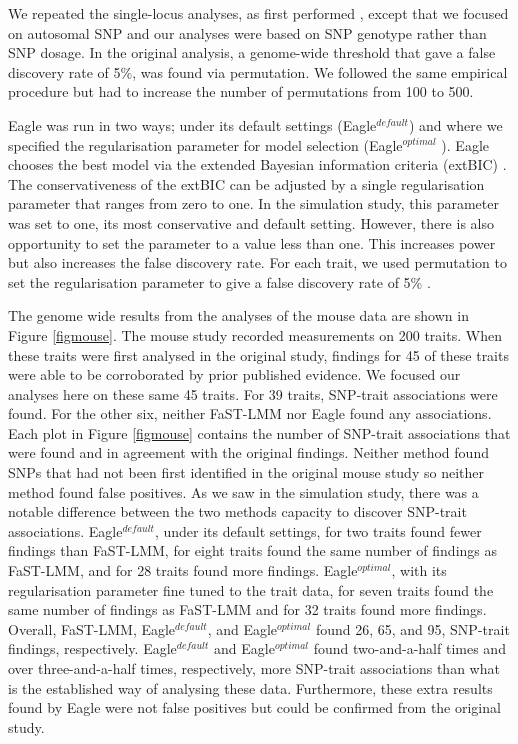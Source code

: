 \documentclass{nature}
\begin{document}
We repeated the single-locus analyses, as first performed  \cite{nicod2016genome}, except 
that we focused on autosomal SNP and our analyses were based on SNP genotype  rather than SNP dosage. 
In the original analysis, a genome-wide threshold that gave a false discovery rate of 5\%, was found via permutation. We followed the 
same empirical procedure but had to increase the number of permutations from 100 to 500. 

Eagle was run in two ways; under its default settings (Eagle$^{default}$) and where we specified the regularisation parameter for model selection (Eagle$^{optimal}$ ). Eagle chooses the best model via the extended Bayesian information criteria (extBIC) \cite{chen2008extended}. 
  The conservativeness of the extBIC can be adjusted by a single regularisation parameter that ranges from zero to one. In the simulation study, this parameter was set to one, its most conservative and default setting. However, there is also opportunity to set the parameter to a value less than one. This increases power but also increases the false discovery rate. For each trait, we used permutation to set the regularisation parameter to give a false discovery rate of 5\% .

The genome wide results from the analyses of the mouse data are shown in Figure  \ref{figmouse}. The mouse study recorded
measurements on 200 traits. When these traits were first analysed in the original study, findings for 45 of these traits were able to be 
corroborated by prior published evidence. We focused our analyses here on these same 45 traits. For 39 traits, SNP-trait associations 
were found. For the other six, neither FaST-LMM nor Eagle found any associations. 
Each plot in Figure  \ref{figmouse} contains the number of SNP-trait associations that were found and in agreement with the original findings. 
Neither method found SNPs that had not been first identified in the original mouse study so neither method found false positives. 
As we saw in the simulation study, there was a notable difference between the two methods capacity to discover SNP-trait associations. Eagle$^{default}$, under its default settings, for two traits found fewer findings than FaST-LMM, for eight traits found the same number 
of findings as FaST-LMM, and for 28 traits found more findings. Eagle$^{optimal}$, 
with its regularisation parameter fine tuned to the trait data, for seven traits found the same number of findings as FaST-LMM and for 32 traits found more findings. Overall, FaST-LMM, Eagle$^{default}$, and Eagle$^{optimal}$ found 26, 65, and 95, SNP-trait findings, respectively. 
Eagle$^{default}$ and Eagle$^{optimal}$ found two-and-a-half times and over three-and-a-half times, respectively, more SNP-trait 
associations than what is the established way of analysing these data. Furthermore, these extra results found by Eagle were not 
false positives but could be confirmed from the original study. 
\end{document}
